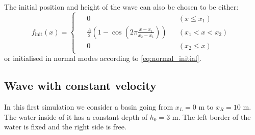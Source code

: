 The initial position and height of the wave can also be chosen to be either:
\begin{equation}
    f_\textrm{init}(x) = \begin{cases}
        \begin{aligned}
            &0 &&(x \le x_1)\\
            & {\frac{A}{2} \left( 1 - \cos \left( 2\pi\frac{x-x_1}{x_2-x_1} \right) \right)} &&(x_1 < x < x_2)\\
            &0 &&(x_2 \le x)
        \end{aligned}
    \end{cases}
    \label{eq:form_init}
\end{equation}
or initialised in normal modes according to \autoref{eq:normal_initial}.




\subsection{Wave with constant velocity}
In this first simulation we consider a basin going from $x_L = 0$ \si{\meter} to $x_R = 10$ \si{\meter}. The water inside of it has a constant depth of $h_0 = 3$ \si{\meter}. The left border of the water is fixed and the right side is free. 

